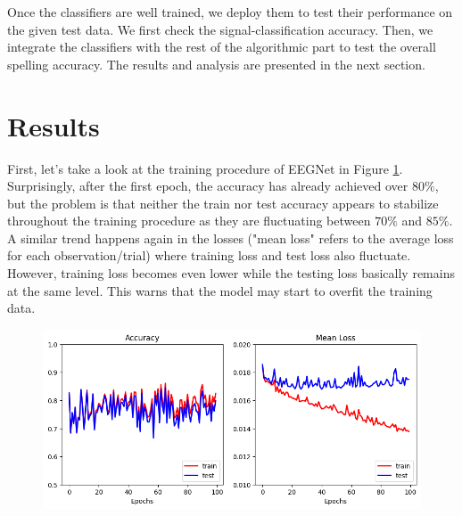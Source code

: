 \documentclass{article}
\begin{document}
\vspace{-3mm}
Once the classifiers are well trained, we deploy them to test their performance on the given test data. We first check the signal-classification accuracy. Then, we integrate the classifiers with the rest of the algorithmic part to test the overall spelling accuracy. The results and analysis are presented in the next section.


\section{Results} \label{Results}
First, let's take a look at the training procedure of EEGNet in Figure \ref{fig:8}. Surprisingly, after the first epoch, the accuracy has already achieved over $80\%$, but the problem is that neither the train nor test accuracy appears to stabilize throughout the training procedure as they are fluctuating between $70\%$ and $85\%$. A similar trend happens again in the losses ("mean loss" refers to the average loss for each observation/trial) where training loss and test loss also fluctuate. However, training loss becomes even lower while the testing loss basically remains at the same level. This warns that the model may start to overfit the training data.

\vspace{-3mm}
\begin{figure}[H]
	\centering
	\includegraphics[width=0.8\linewidth]{eegnet_training.png}
	\label{fig:8}
\end{figure}
\end{document}
